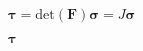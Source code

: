 \documentclass{article}
\begin{document}
$ \boldsymbol{\tau} = \text{det} \left( \mathbf{F} \right) \boldsymbol{\sigma} = J \boldsymbol{\sigma} $
\pagebreak

$ \boldsymbol{\tau}$
\pagebreak
\end{document}
